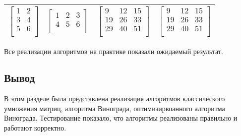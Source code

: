 \begin{table}[H]
\begin{center}
\begin{tabular}{ | c | c | c | c |}
			$\begin{bmatrix} 
   			1&2 \\
    			3&4 \\ 
   			5&6 \\ 
			\end{bmatrix}$ & 
			$\begin{bmatrix} 
   			1&2&3 \\
    			4&5&6 \\ 
			\end{bmatrix}$ &
			$\begin{bmatrix} 
   			9&12&15 \\
    			19&26&33 \\ 
   			29&40&51 \\ 
			\end{bmatrix} $ &
			$\begin{bmatrix} 
   			9&12&15 \\
    			19&26&33 \\ 
   			29&40&51 \\ 
			\end{bmatrix} $ \\
			\hline
		\end{tabular}
		
 \end{center}
\end{table} 

Все реализации алгоритмов на практике показали ожидаемый результат.

\subsection{Вывод}

В этом разделе была представлена реализация алгоритмов классического умножения матриц, алгоритма Винограда, оптимизирвоанного алгоритма Винограда. Тестирование показало, что алгоритмы реализованы правильно и работают корректно.